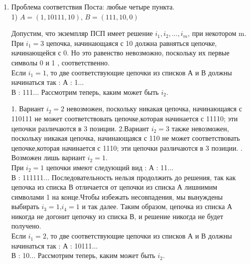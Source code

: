 \documentclass[12pt,a4paper]{article}
\begin{document}
\begin{enumerate}
\item Проблема соответствия Поста: любые четыре пункта.\\
	1) $A=(1,10111,10)$, $B=(111,10,0)$
	
	Допустим, что экземпляр ПСП имеет решение $i_{1},i_{2},...,i_{m}$, при некотором m.
	При $i_{1} = 3$ цепочка, начинающаяся с 10 должна равняться цепочке, начинающейся с 0. Но это равенство невозможно, поскольку их первые символы 0 и 1 , соответственно.\\
	Если $i_{1} = 1$, то две соответствующие цепочки из списков А и В должны начинаться так :
	\newline
	А : 1... \\
	В : 111...
	\newline
	Рассмотрим теперь, каким может быть $i_2$. 
	
	1. Вариант $i_2 = 2$ невозможен, поскольку никакая цепочка, начинающаяся с 110111 не может соответствовать цепочке,которая начинается с 11110; эти цепочки различаются в 3 позиции.
	\newline
	2.Вариант $i_2 = 3$ также невозможен, поскольку никакая цепочка, начинающаяся с 110 не может соответствовать цепочке,которая начинается с 1110; эти цепочки различаются в 3 позиции.
	. Возможен лишь вариант $i_2 = 1$.\\
	При $i_2 = 1$ цепочки имеют следующий вид :
	\newline
	А : 11...\\
	В : 111111...
	\newline
	Последовательность нельзя продолжить до решения, так как цепочка из списка В отличается от цепочки из списка А лишнимим символами 1 на конце.Чтобы избежать несовпадения, мы вынуждены выбирать $i_3 = 1$,$i_4 = 1$ и так далее. Таким образом, цепочка из списка А никогда не догонит цепочку из списка В, и решение никогда не будет получено.\\
	
	Если $i_{1} = 2$, то две соответствующие цепочки из списков А и В должны начинаться так :
	\newline
	А : 10111... \\
	В : 10...
	\newline
	Рассмотрим теперь, каким может быть $i_2$. 
	

\end{enumerate}
\end{document}
